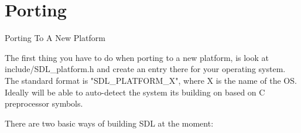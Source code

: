\chapter{Porting }
\hypertarget{md__mono_runtime_2extern_2sdl_2docs_2_r_e_a_d_m_e-porting}{}\label{md__mono_runtime_2extern_2sdl_2docs_2_r_e_a_d_m_e-porting}

\begin{DoxyItemize}
\item Porting To A New Platform

The first thing you have to do when porting to a new platform, is look at include/\+\+SDL\+\_\+platform.\+h and create an entry there for your operating system. The standard format is "{}\+SDL\+\_\+\+PLATFORM\+\_\+\+X"{}, where X is the name of the OS. Ideally  will be able to auto-\/detect the system it\textquotesingle{}s building on based on C preprocessor symbols.
\end{DoxyItemize}

There are two basic ways of building SDL at the moment:\+



